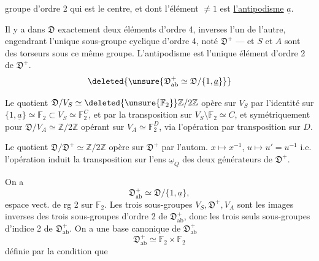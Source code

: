 groupe d'ordre 2  qui est le centre, et dont l'élément
$\ne1$ est \uline{l'antipodisme} $\underline{a}$.

Il y a dans $\mathfrak{D}$ exactement deux éléments 
d'ordre 4, inverses l'un de l'autre, engendrant l'unique sous-groupe cyclique
d'ordre 4, noté $\mathfrak{D}^+$ --- et $S$ et $A$ sont des torseurs sous ce
même groupe. L'antipodisme est l'unique élément d'ordre 2 de $\mathfrak{D}^+$.
\[
\deleted{\unsure{\mathfrak{D}_{\mathrm{ab}}^+\simeq
\mathfrak{D}/\{1,\underline{a}\}}}
\]

Le quotient $\mathfrak{D}/V_S\simeq\deleted{\unsure{\mathbb{F}_2}}\mathbb{Z}/2\mathbb{Z}$
opère sur $V_S$ par l'identité sur
$\{1,\underline{a}\}\simeq\mathbb{F}_2\subset V_S\simeq\mathbb{F}_2^C$,
et par la transposition sur $V_S\setminus\mathbb{F}_2\simeq C$,
et symétriquement pour $\mathfrak{D}/V_A\simeq\mathbb{Z}/2\mathbb{Z}$ opérant sur
$V_A\simeq\mathbb{F}_2^D$, 
via l'opération par transposition sur $D$.

Le quotient $\mathfrak{D}/\mathfrak{D}^+\simeq\mathbb{Z}/2\mathbb{Z}$ opère
sur $\mathfrak{D}^+$ par l'autom.
 $x\mapsto x^{-1}$,
$u\mapsto u'=u^{-1}$ i.e. l'opération induit la transposition sur l'ens
$\underline{\omega}_Q$ des deux générateurs de
 $\mathfrak{D}^+$.

On a
\[
\mathfrak{D}_{\mathrm{ab}}^+
 \simeq \mathfrak{D}/\{1,\underline{a}\},
\]
espace vect. de rg 2 sur $\mathbb{F}_2$.
Les trois sous-groupes $V_S,\mathfrak{D}^+,V_A$ sont les images inverses des
trois sous-groupes d'ordre 2 de
$\mathfrak{D}_{\mathrm{ab}}^+$,
donc les trois seuls sous-groupes d'indice 2 de
$\mathfrak{D}_{\mathrm{ab}}^+$.
On a une base canonique de
$\mathfrak{D}_{\mathrm{ab}}^+$
\[
\mathfrak{D}_{\mathrm{ab}}^+
 \simeq\mathbb{F}_2\times\mathbb{F}_2
\]
définie par la condition que


